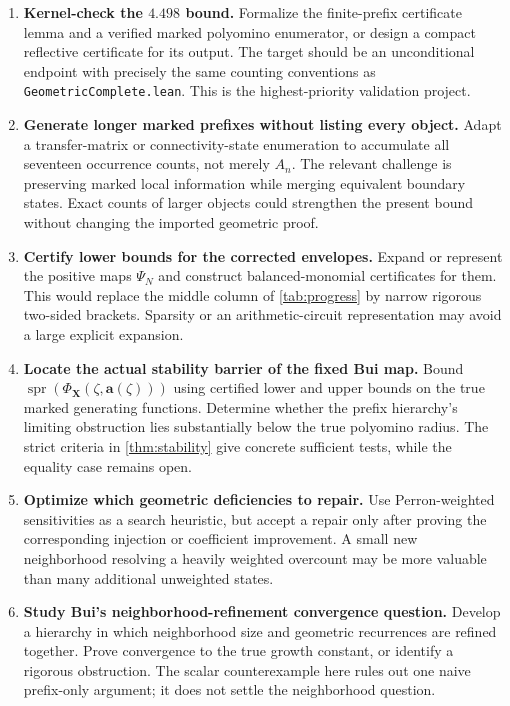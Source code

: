 \documentclass[11pt,a4paper]{article}
\theoremstyle{definition}
\theoremstyle{remark}
\newcommand{\bA}{\boldsymbol a}
\newcommand{\bX}{\boldsymbol X}
\newcommand{\spr}{\operatorname{spr}}
\begin{document}
\begin{enumerate}[label=\textbf{\arabic*.},leftmargin=2em]
\item \textbf{Kernel-check the $4.498$ bound.}
Formalize the finite-prefix certificate lemma and a verified marked
polyomino enumerator, or design a compact reflective certificate for its
output. The target should be an unconditional endpoint with precisely the
same counting conventions as \texttt{GeometricComplete.lean}. This is the
highest-priority validation project.

\item \textbf{Generate longer marked prefixes without listing every object.}
Adapt a transfer-matrix or connectivity-state enumeration to accumulate all
seventeen occurrence counts, not merely $A_n$. The relevant challenge is
preserving marked local information while merging equivalent boundary
states. Exact counts of larger objects could strengthen the present bound
without changing the imported geometric proof.

\item \textbf{Certify lower bounds for the corrected envelopes.}
Expand or represent the positive maps $\Psi_N$ and construct balanced-monomial
certificates for them. This would replace the middle column of
\cref{tab:progress} by narrow rigorous two-sided brackets. Sparsity or an
arithmetic-circuit representation may avoid a large explicit expansion.

\item \textbf{Locate the actual stability barrier of the fixed Bui map.}
Bound $\spr(\Phi_{\bX}(\zeta,\bA(\zeta)))$ using certified lower and upper
bounds on the true marked generating functions. Determine whether the
prefix hierarchy's limiting obstruction lies substantially below the true
polyomino radius. The strict criteria in \cref{thm:stability} give concrete
sufficient tests, while the equality case remains open.

\item \textbf{Optimize which geometric deficiencies to repair.}
Use Perron-weighted sensitivities as a search heuristic, but accept a repair
only after proving the corresponding injection or coefficient improvement.
A small new neighborhood resolving a heavily weighted overcount may be more
valuable than many additional unweighted states.

\item \textbf{Study Bui's neighborhood-refinement convergence question.}
Develop a hierarchy in which neighborhood size and geometric recurrences
are refined together. Prove convergence to the true growth constant, or
identify a rigorous obstruction. The scalar counterexample here rules out
one naive prefix-only argument; it does not settle the neighborhood question.


\end{enumerate}
\end{document}
